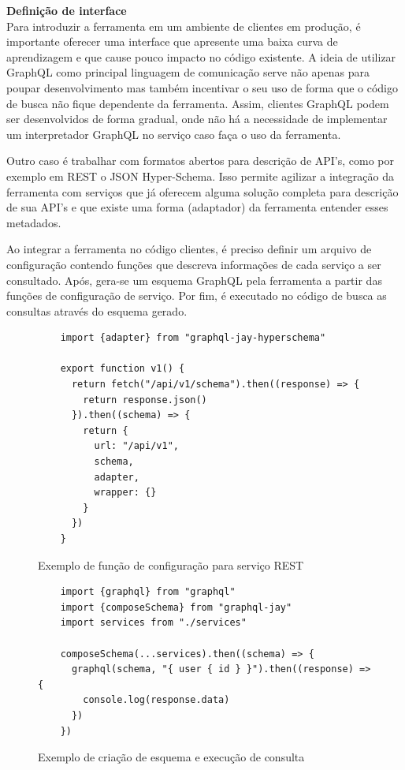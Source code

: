 \textbf{Definição de interface} \\

Para introduzir a ferramenta em um ambiente de clientes em produção, é importante oferecer uma interface que apresente uma baixa curva de aprendizagem e que cause pouco impacto no código existente. A ideia de utilizar GraphQL como principal linguagem de comunicação serve não apenas para poupar desenvolvimento mas também incentivar o seu uso de forma que o código de busca não fique dependente da ferramenta. Assim, clientes GraphQL podem ser desenvolvidos de forma gradual, onde não há a necessidade de implementar um interpretador GraphQL no serviço caso faça o uso da ferramenta. 

Outro caso é trabalhar com formatos abertos para descrição de API's, como por exemplo em REST o JSON Hyper-Schema. Isso permite agilizar a integração da ferramenta com serviços que já oferecem alguma solução completa para descrição de sua API's e que existe uma forma (adaptador) da ferramenta entender esses metadados.

Ao integrar a ferramenta no código clientes, é preciso definir um arquivo de configuração contendo funções que descreva informações de cada serviço a ser consultado. Após, gera-se um esquema GraphQL pela ferramenta a partir das funções de configuração de serviço. Por fim, é executado no código de busca as consultas através do esquema gerado.

\begin{figure}[H]
  \centering
  \begin{verbatim}
    import {adapter} from "graphql-jay-hyperschema"
  
    export function v1() {
      return fetch("/api/v1/schema").then((response) => {
        return response.json()
      }).then((schema) => {
        return {
          url: "/api/v1",
          schema,
          adapter,
          wrapper: {}
        }
      })
    }
  \end{verbatim}
  \caption{Exemplo de função de configuração para serviço REST}
\end{figure}

\begin{figure}[H]
  \centering
  \begin{verbatim}
    import {graphql} from "graphql"
    import {composeSchema} from "graphql-jay"
    import services from "./services"
    
    composeSchema(...services).then((schema) => {
      graphql(schema, "{ user { id } }").then((response) => { 
        console.log(response.data)
      })
    })
  \end{verbatim}
  \caption{Exemplo de criação de esquema e execução de consulta}
\end{figure}

